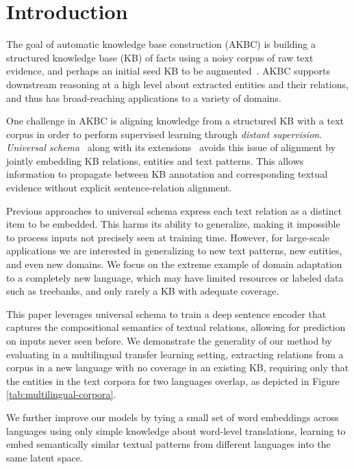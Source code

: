 
\section{Introduction}
\label{introduction}
The goal of automatic knowledge base construction (AKBC) is building a structured knowledge base (KB) of facts using a noisy corpus of raw text evidence, and perhaps an initial seed KB to be augmented~\citep{NELL,yago,freebase}. AKBC supports downstream reasoning at a high level about extracted entities and their relations, and thus has broad-reaching applications to a variety of domains.

One challenge in AKBC is aligning knowledge from a structured KB with a text corpus in order to perform supervised learning through \emph{distant supervision}. \emph{Universal schema}~\citep{limin} along with its extensions~\citep{yao2013universal,vector_pra,neelakantan2015compositional,logicmfnaacl15,toutanova2015representing} avoids this issue of alignment by jointly embedding KB relations, entities and text patterns. This allows information to propagate between KB annotation and corresponding textual evidence without explicit sentence-relation alignment.

Previous approaches to universal schema express each text relation as a distinct item to be embedded. This harms its ability to generalize, making it impossible to process inputs not precisely seen at training time. However, for large-scale applications we are interested in generalizing to new text patterns, new entities, and even new domains. We focus on the extreme example of domain adaptation to a completely new language, which may have limited resources or labeled data such as treebanks, and only rarely a KB with adequate coverage. 

This paper leverages universal schema  to train a deep sentence encoder that captures the compositional semantics of textual relations, allowing for prediction on inputs never seen before. We demonstrate the generality of our method by evaluating in a multilingual transfer learning setting, extracting relations from a corpus in a new language with no coverage in an existing KB, requiring only that the entities in the text corpora for two languages overlap, as depicted in Figure \ref{tab:multilingual-corpora}.

We further improve our models by tying a small set of word embeddings across languages using only simple knowledge about word-level translations, learning to embed semantically similar textual patterns from different languages into the same latent space.

